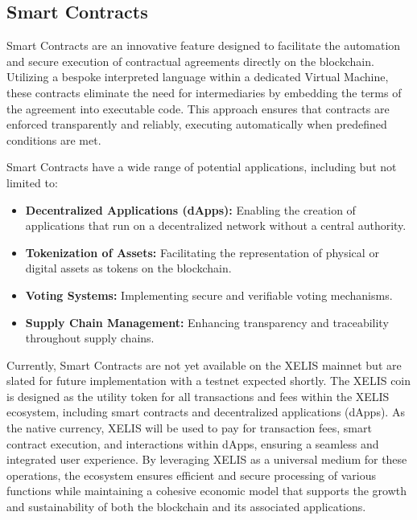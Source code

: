 \documentclass[10pt,a4paper,twocolumn]{article}
\begin{document}
\subsection{Smart Contracts}

Smart Contracts are an innovative feature designed to facilitate the automation and secure execution of contractual agreements directly on the blockchain. Utilizing a bespoke interpreted language within a dedicated Virtual Machine, these contracts eliminate the need for intermediaries by embedding the terms of the agreement into executable code. This approach ensures that contracts are enforced transparently and reliably, executing automatically when predefined conditions are met.

Smart Contracts have a wide range of potential applications, including but not limited to:\\

\begin{itemize}
\item \textbf{Decentralized Applications (dApps):} Enabling the creation of applications that run on a decentralized network without a central authority.

\item \textbf{Tokenization of Assets:} Facilitating the representation of physical or digital assets as tokens on the blockchain.

\item \textbf{Voting Systems:} Implementing secure and verifiable voting mechanisms.

\item \textbf{Supply Chain Management:} Enhancing transparency and traceability throughout supply chains.\\
\end{itemize}

Currently, Smart Contracts are not yet available on the XELIS mainnet but are slated for future implementation with a testnet expected shortly. The XELIS coin is designed as the utility token for all transactions and fees within the XELIS ecosystem, including smart contracts and decentralized applications (dApps). As the native currency, XELIS will be used to pay for transaction fees, smart contract execution, and interactions within dApps, ensuring a seamless and integrated user experience. By leveraging XELIS as a universal medium for these operations, the ecosystem ensures efficient and secure processing of various functions while maintaining a cohesive economic model that supports the growth and sustainability of both the blockchain and its associated applications.
\end{document}
